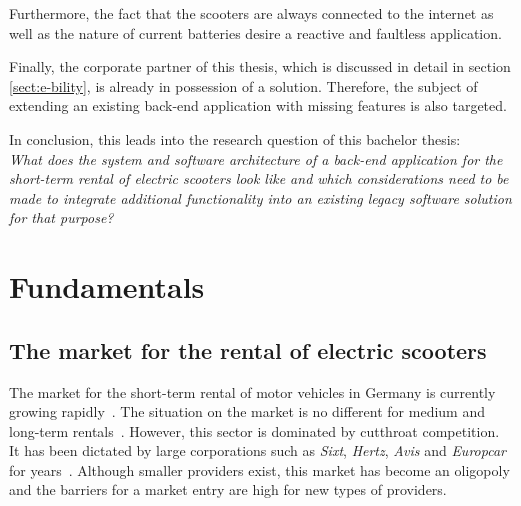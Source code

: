 \documentclass[12pt,a4paper,twoside]{report}
\begin{document}
Furthermore, the fact that the scooters are always connected to the internet
as well as the nature of current batteries desire a reactive and faultless application.

Finally, the corporate partner of this thesis, which is discussed in detail
in section \ref{sect:e-bility}, is already in possession of a solution.
Therefore, the subject of extending an existing back-end application
with missing features is also targeted.

In conclusion, this leads into the research question of this bachelor thesis:\\
\emph{What does the system and software architecture of a back-end application
for the short-term rental of electric scooters look like and which considerations
need to be made to integrate additional functionality into an
existing legacy software solution for that purpose?}



\chapter{Fundamentals} \label{chap:fundamentals}



\section{The market for the rental of electric scooters} \label{sect:electric-scooter-market}

The market for the short-term rental of motor vehicles in Germany
is currently growing rapidly~\cite{bundesverband-carsharing-statistics}.
The situation on the market is no different for medium and long-term rentals~\cite{sparkasse-kfz-vermietung}.
However, this sector is dominated by cutthroat competition.
It has been dictated by large corporations such as \textit{Sixt}, \textit{Hertz},
\textit{Avis} and \textit{Europcar} for years~\cite{sparkasse-kfz-vermietung}.
Although smaller providers exist, this market has become an oligopoly and
the barriers for a market entry are high for new types of providers.
\end{document}
